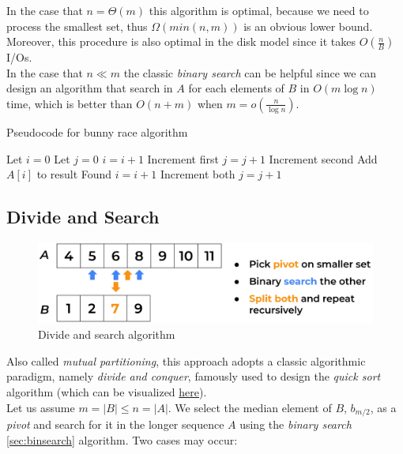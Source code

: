 In the case that $n=\Theta (m)$ this algorithm is optimal, because we need to process the smallest set, thus $\Omega(min(n,m))$ is an obvious lower bound. Moreover, this procedure is also optimal in the disk model since it takes $O \left(\frac{n}{B}\right)$ I/Os. \\
In the case that $n \ll m$ the classic \textit{binary search} can be helpful since we can design an algorithm that search in $A$ for each elements of $B$ in $O(m \log n)$ time, which is better than $O(n+m)$ when $m=o\left(\frac{n}{\log n}\right)$.

\begin{algorithm}
    \captionsetup{labelsep=newline}
    \caption{Pseudocode for bunny race algorithm \label{alg:bunnyrace}}
    \begin{algorithmic}[1]
        \State Let $i=0$ 
        \State Let $j=0$ 
                \State $i=i+1$ \Comment Increment first
                \State $j=j+1$ \Comment Increment second
            \Else
                \State Add $A[i]$ to result \Comment Found
                \State $i=i+1$  \Comment Increment both
                \State $j=j+1$
            \EndIf
        \EndWhile
    \end{algorithmic}
\end{algorithm}

\subsection{Divide and Search \label{sec:divandsearch}}

\begin{figure}[H] 
    \begin{center}
        \includegraphics[width=.8\textwidth]{imgs/divide_and_search.png}
        \caption{Divide and search algorithm \label{fig:divandsearch}}
    \end{center}
\end{figure}

Also called \textit{mutual partitioning}, this approach adopts a classic algorithmic paradigm, namely \textit{divide and conquer}, famously used to design the \textit{quick sort} algorithm (which can be visualized \href{https://en.wikipedia.org/wiki/Quicksort}{here}).\\
Let us assume $m=|B| \leq n=|A|$. We select the median element of $B$, $b_{m/2}$, as a \textit{pivot} and search for it in the longer sequence $A$ using the \textit{binary search} \ref{sec:binsearch} algorithm.
Two cases may occur: 


